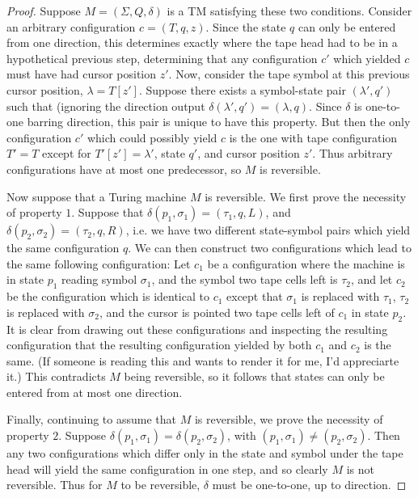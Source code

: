 \begin{proof}
	Suppose $M = (\Sigma,Q,\delta)$ is a TM satisfying these two conditions. Consider an arbitrary configuration $c = (T,q,z)$. Since the state $q$ can only be entered from one direction, this determines exactly where the tape head had to be in a hypothetical previous step, determining that any configuration $c'$ which yielded $c$ must have had cursor position $z'$. Now, consider the tape symbol at this previous cursor position, $\lambda = T[z']$. Suppose there exists a symbol-state pair $(\lambda',q')$ such that (ignoring the direction output $\delta(\lambda',q') = (\lambda,q)$. Since $\delta$ is one-to-one barring direction, this pair is unique to have this property. But then the only configuration $c'$ which could possibly yield $c$ is the one with tape configuration $T' = T$ except for $T'[z'] = \lambda'$, state $q'$, and cursor position $z'$. Thus arbitrary configurations have at most one predecessor, so $M$ is reversible.
	\par Now suppose that a Turing machine $M$ is reversible. We first prove the necessity of property $1$. Suppose that $\delta(p_1,\sigma_1) = (\tau_1,q,L)$, and $\delta(p_2,\sigma_2) = (\tau_2,q,R)$, i.e. we have two different state-symbol pairs which yield the same configuration $q$. We can then construct two configurations which lead to the same following configuration: Let $c_1$ be a configuration where the machine is in state $p_1$ reading symbol $\sigma_1$, and the symbol two tape cells left is $\tau_2$, and let $c_2$ be the configuration which is identical to $c_1$ except that $\sigma_1$ is replaced with $\tau_1$, $\tau_2$ is replaced with $\sigma_2$, and the cursor is pointed two tape cells left of $c_1$ in state $p_2$. It is clear from drawing out these configurations and inspecting the resulting configuration that the resulting configuration yielded by both $c_1$ and $c_2$ is the same. (If someone is reading this and wants to render it for me, I'd appreciarte it.) This contradicts $M$ being reversible, so it follows that states can only be entered from at most one direction. 
	\par Finally, continuing to assume that $M$ is reversible, we prove the necessity of property $2$. Suppose $\delta(p_1,\sigma_1) = \delta(p_2,\sigma_2)$, with $(p_1,\sigma_1) \neq (p_2,\sigma_2)$. Then any two configurations which differ only in the state and symbol under the tape head will yield the same configuration in one step, and so clearly $M$ is not reversible. Thus for $M$ to be reversible, $\delta$ must be one-to-one, up to direction. 
\end{proof}

